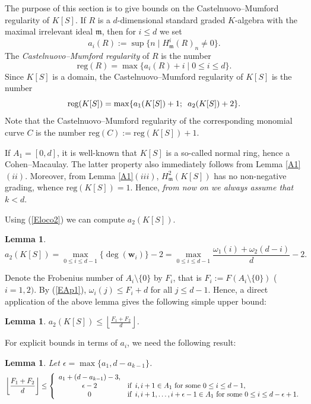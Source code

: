 \documentclass[11pt]{article}
\newtheorem{Lemma}[Theorem]{Lemma}
\def\deg{\operatorname{deg}}
\def\reg{\mathrm{reg}}
\def\mfr{{\frak m}}
\def\wbf{{\mathbf w}}
\def\mfr{{\mathfrak m}}
\theoremstyle{remark}
\theoremstyle{definition}
\begin{document}
The purpose of this section is to give bounds on the Castelnuovo--Mumford regularity of $K[S]$. If $R$ is a $d$-dimensional standard graded $K$-algebra with the maximal irrelevant ideal $\mfr$, then 
for $ i \leq d$ we set
$$ a_i(R) := \sup\{ n\mid  H^i_{\mfr} (R)_n \neq 0 \}.$$
The {\it Castelnuovo--Mumford regularity} of  $R$ is the number
$$\reg(R) = \max \{ a_i(R) + i\mid 0\leq i \leq d\}.$$
Since $K[S]$ is a domain, the  Castelnuovo--Mumford regularity of $K[S]$ is the number
$$\reg(K[S]) = \max\{ a_1(K[S]) + 1;\enskip a_2(K[S]) + 2\}.$$
Note that the Castelnuovo--Mumford regularity of the corresponding monomial curve $C$ is the number $\reg(C) := \reg(K[S])+1$.

If $A_1 = [0,d]$, it is well-known that $K[S]$ is a so-called normal ring, hence a Cohen--Macaulay. The latter property also immediately follows from  Lemma \ref{A1}\((ii)\).  Moreover, from  Lemma \ref{A1}\((iii)\), $H^2_{\mfr} (K[S]) $ has no  non-negative grading, whence $\reg(K[S]) = 1$. Hence, {\it from now on we always assume that $k< d$}.

Using (\ref{Eloco2}) we can compute $a_2(K[S])$.

\begin{Lemma} \label{B1} 
$$a_2(K[S]) =  \max_{0 \le i \le d-1}\{\deg(\wbf_i) \} - 2 =  \max_{0 \le i \le d-1}\frac{\omega_1(i) + \omega_2(d-i)}{d} - 2.$$
\end{Lemma}

Denote the Frobenius number of $A_i \setminus \{0\}$ by $F_i$, that is  $F_i := F(A_i \setminus \{0\})$ ($i =1,2)$. By (\ref{EAp1}), $\omega_i( j) \le F_i + d$ for all $j\le d-1$. Hence, a direct application of the above lemma gives  the following simple upper bound:

\begin{Lemma} \label{B2}  $a_2(K[S]) \le \left\lfloor \frac{F_1 + F_2}{d} \right\rfloor$.
\end{Lemma}

For explicit bounds in terms of $a_i$, we need the following result:
\begin{Lemma} \label{FrobSum} Let $\epsilon = \max\{a_1, d-a_{k-1}\} $.
\[\left\lfloor \frac{F_1+F_2}{d} \right\rfloor \le\left\{ \begin{array}{cl}
a_1 + (d-a_{k-1}) -3,\\
\epsilon-2 &\text{if}\enskip i, i+1 \in A_1\  \text{for some}\ 0\leq i \leq d-1,\\
0&\text{if}\enskip i, i+1,\ldots, i+\epsilon -1  \in A_1 \  \text{for some}\ 0\leq i \leq d-\epsilon + 1.
\end{array} \right.\]
\end{Lemma}
\end{document}
